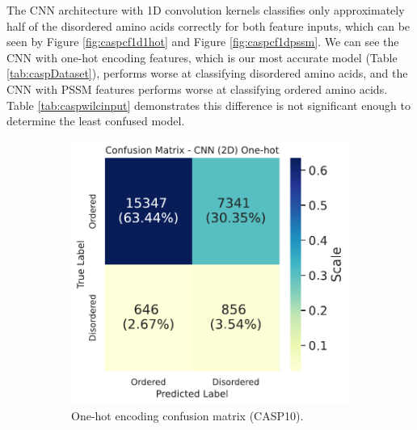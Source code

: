 \documentclass{l4proj}
\begin{document}
The CNN architecture with 1D convolution kernels classifies only approximately half of the disordered amino acids correctly for both feature inputs, which can be seen by Figure \ref{fig:caspcf1d1hot} and Figure \ref{fig:caspcf1dpssm}. We can see the CNN with one-hot encoding features, which is our most accurate model (Table \ref{tab:caspDataset}), performs worse at classifying disordered amino acids, and the CNN with PSSM features performs worse at classifying ordered amino acids. Table \ref{tab:caspwilcinput} demonstrates this difference is not significant enough to determine the least confused model. \\

\begin{figure}[!htb] 
    \centering
    \begin{subfigure}[b]{0.48\textwidth}
        \includegraphics[width=\textwidth]{images/confmats/CASP10CNN2D1hot-cf.pdf}
        \caption{One-hot encoding confusion matrix (CASP10).}
        \label{fig:caspcf2d1hot}
    \end{subfigure}
    ~
    \begin{subfigure}[b]{0.48\textwidth}

\end{subfigure}
\end{figure}
\end{document}
